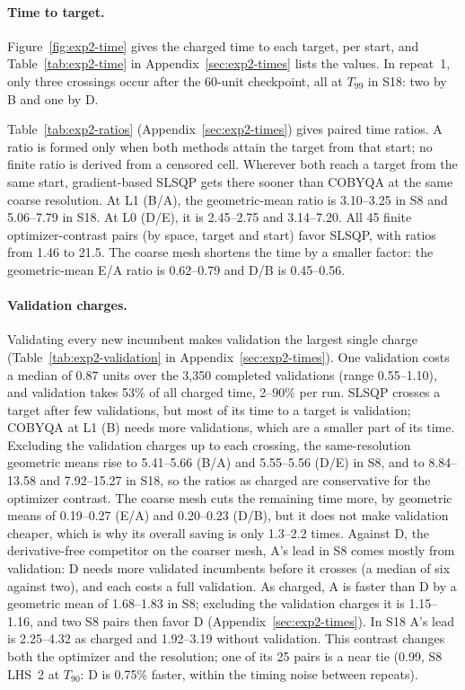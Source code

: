 \paragraph{Time to target.}
Figure~\ref{fig:exp2-time} gives the charged time to each target, per
start, and Table~\ref{tab:exp2-time} in Appendix~\ref{sec:exp2-times} lists
the values. In repeat~1, only three crossings occur
after the 60-unit checkpoint, all at $T_{99}$ in S18: two by B and one
by D.

Table~\ref{tab:exp2-ratios} (Appendix~\ref{sec:exp2-times}) gives paired time ratios. A ratio is formed
only when both methods attain the target from that start; no finite ratio
is derived from a censored cell. Wherever both reach a target from the
same start, gradient-based SLSQP gets there sooner than COBYQA at the same
coarse resolution. At L1 (B/A), the geometric-mean ratio is 3.10--3.25 in
S8 and 5.06--7.79 in S18. At L0 (D/E), it is 2.45--2.75 and
3.14--7.20.
All 45 finite optimizer-contrast pairs (by space, target and start) favor
SLSQP, with ratios from 1.46 to 21.5. The coarse mesh shortens the time by
a smaller factor: the geometric-mean E/A ratio is 0.62--0.79 and D/B is
0.45--0.56.

\paragraph{Validation charges.}
Validating every new incumbent makes validation the largest single
charge (Table~\ref{tab:exp2-validation} in Appendix~\ref{sec:exp2-times}). One validation costs a median of
0.87 units over the 3,350 completed validations (range 0.55--1.10), and
validation takes 53\% of all charged time, 2--90\% per run. SLSQP crosses
a target after few validations, but most of its time to a target is
validation; COBYQA at L1 (B) needs more validations, which are a smaller
part of its time. Excluding the validation charges up to each crossing, the
same-resolution geometric means rise to 5.41--5.66 (B/A) and 5.55--5.56
(D/E) in S8, and to 8.84--13.58 and 7.92--15.27 in S18, so the
ratios as charged are conservative for the optimizer contrast. The coarse
mesh cuts the remaining time more, by geometric means of 0.19--0.27 (E/A)
and 0.20--0.23 (D/B), but it does not make validation cheaper, which is why
its overall saving is only 1.3--2.2 times. Against D, the derivative-free
competitor on the coarser mesh, A's lead in S8 comes mostly from
validation: D needs more validated incumbents before it crosses (a median
of six against two), and each costs a full validation. As charged, A is
faster than D by a geometric mean of 1.68--1.83 in S8; excluding the
validation charges it is 1.15--1.16, and two S8 pairs then favor D
(Appendix~\ref{sec:exp2-times}). In S18 A's lead is 2.25--4.32 as charged
and 1.92--3.19 without validation. This contrast changes both the
optimizer and the resolution; one of its 25 pairs is a near tie (0.99, S8
LHS~2 at $T_{90}$: D is 0.75\% faster, within the timing noise between
repeats).

